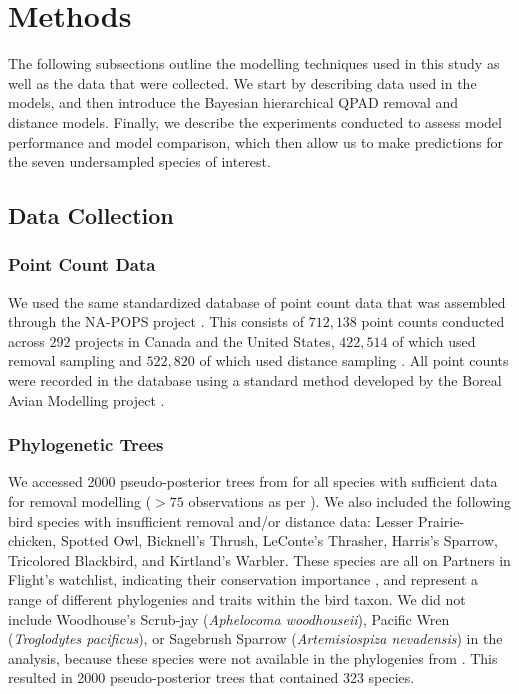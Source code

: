 \documentclass[12pt]{article}
\begin{document}
\section{Methods}

\par The following subsections outline the modelling techniques used in this study as well as the data that were collected. 
We start by describing data used in the models, and then introduce the Bayesian hierarchical QPAD removal and distance models.
Finally, we describe the experiments conducted to assess model performance and model comparison, which then allow us to make predictions for the seven undersampled species of interest.

\subsection{Data Collection}
\subsubsection{Point Count Data}
\par We used the same standardized database of point count data that was assembled through the NA-POPS project \citep{edwards_point_2023}. 
This consists of $712,138$ point counts conducted across $292$ projects in Canada and the United States, $422,514$ of which used removal sampling \citep{alldredge_time--detection_2007, farnsworth_removal_2002} and $522,820$ of which used distance sampling \citep{buckland_introduction_2001, buckland_distance_2015}.
 All point counts were recorded in the database using a standard method developed by the Boreal Avian Modelling project \citep{barker_ecological_2015}.

\subsubsection{Phylogenetic Trees}
\par We accessed 2000 pseudo-posterior trees from \citet{jetz_global_2012} for all species with sufficient data for removal modelling ($>75$ observations as per \cite{edwards_point_2023,solymos_evaluating_2018,buckland_introduction_2001}). 
We also included the following bird species with insufficient removal and/or distance data: Lesser Prairie-chicken, Spotted Owl, Bicknell's Thrush, LeConte's Thrasher, Harris's Sparrow, Tricolored Blackbird, and Kirtland's Warbler. 
These species are all on Partners in Flight's watchlist, indicating their conservation importance \citep{will_handbook_2020}, and represent a range of different phylogenies and traits within the bird taxon.
We did not include Woodhouse's Scrub-jay (\textit{Aphelocoma woodhouseii}), Pacific Wren (\textit{Troglodytes pacificus}), or Sagebrush Sparrow (\textit{Artemisiospiza nevadensis}) in the analysis, because these species were not available in the phylogenies from \citet{jetz_global_2012}.
This resulted in 2000 pseudo-posterior trees that contained 323 species.
\end{document}
